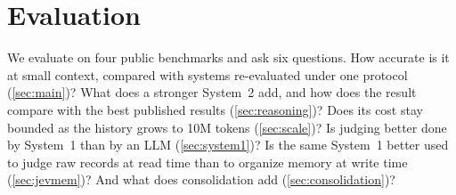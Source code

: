 \section{Evaluation}
\label{sec:eval}

We evaluate \sys{} on four public benchmarks and ask six questions.
How accurate is it at small context, compared with systems re-evaluated under one protocol (\cref{sec:main})?
What does a stronger System~2 add, and how does the result compare with the best published results (\cref{sec:reasoning})?
Does its cost stay bounded as the history grows to 10M tokens (\cref{sec:scale})?
Is judging better done by System~1 than by an LLM (\cref{sec:system1})?
Is the same System~1 better used to judge raw records at read time than to organize memory at write time (\cref{sec:jevmem})?
And what does consolidation add (\cref{sec:consolidation})?
